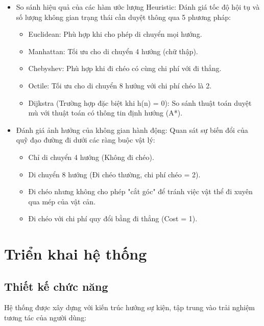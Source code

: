 \documentclass[12pt,a4paper]{report}
\begin{document}
\begin{itemize}
    \item So sánh hiệu quả của các hàm ước lượng Heuristic: Đánh giá tốc độ hội tụ và số lượng không gian trạng thái cần duyệt thông qua 5 phương pháp:
    \begin{itemize}
        \item Euclidean: Phù hợp khi cho phép di chuyển mọi hướng. 
        \item Manhattan: Tối ưu cho di chuyển 4 hướng (chữ thập). 
        \item Chebyshev: Phù hợp khi đi chéo có cùng chi phí với đi thẳng.
        \item Octile: Tối ưu cho di chuyển 8 hướng với chi phí chéo là 2. 
        \item Dijkstra (Trường hợp đặc biệt khi h(n) = 0): So sánh thuật toán duyệt mù với thuật toán có thông tin định hướng (A*).
    \end{itemize}
    \item Đánh giá ảnh hưởng của không gian hành động: Quan sát sự biến đổi của quỹ đạo đường đi dưới các ràng buộc vật lý:
    \begin{itemize}
        \item Chỉ di chuyển 4 hướng (Không đi chéo).
        \item Di chuyển 8 hướng (Đi chéo thường, chi phí chéo = 2).
        \item Đi chéo nhưng không cho phép "cắt góc" để tránh việc vật thể đi xuyên qua mép của vật cản.
        \item Đi chéo với chi phí quy đổi bằng đi thẳng (Cost = 1).
    \end{itemize}
\end{itemize}

\section{Triển khai hệ thống}

\subsection{Thiết kế chức năng}
Hệ thống được xây dựng với kiến trúc hướng sự kiện, tập trung vào trải nghiệm tương tác của người dùng:
\end{document}
